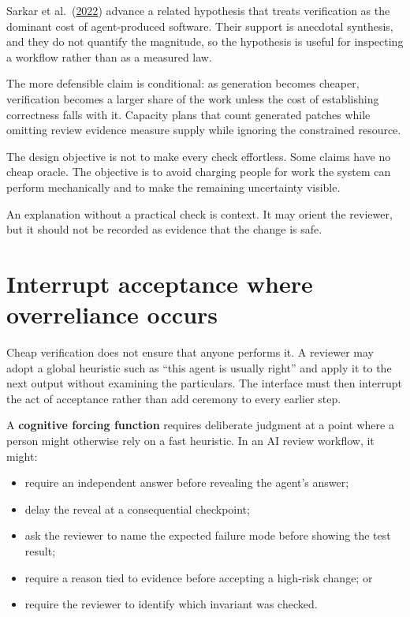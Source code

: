 Sarkar et al.~(\href{https://arxiv.org/abs/2208.06213}{2022}) advance a related hypothesis that treats verification as the dominant cost of agent-produced software. Their support is anecdotal synthesis, and they do not quantify the magnitude, so the hypothesis is useful for inspecting a workflow rather than as a measured law.

The more defensible claim is conditional: as generation becomes cheaper, verification becomes a larger share of the work unless the cost of establishing correctness falls with it. Capacity plans that count generated patches while omitting review evidence measure supply while ignoring the constrained resource.

The design objective is not to make every check effortless. Some claims have no cheap oracle. The objective is to avoid charging people for work the system can perform mechanically and to make the remaining uncertainty visible.

An explanation without a practical check is context. It may orient the reviewer, but it should not be recorded as evidence that the change is safe.

\section{Interrupt acceptance where overreliance occurs}\label{interrupt-acceptance-where-overreliance-occurs}

Cheap verification does not ensure that anyone performs it. A reviewer may adopt a global heuristic such as ``this agent is usually right'' and apply it to the next output without examining the particulars. The interface must then interrupt the act of acceptance rather than add ceremony to every earlier step.

A \textbf{cognitive forcing function} requires deliberate judgment at a point where a person might otherwise rely on a fast heuristic. In an AI review workflow, it might:

\begin{itemize}
\tightlist
\item
  require an independent answer before revealing the agent's answer;
\item
  delay the reveal at a consequential checkpoint;
\item
  ask the reviewer to name the expected failure mode before showing the test result;
\item
  require a reason tied to evidence before accepting a high-risk change; or
\item
  require the reviewer to identify which invariant was checked.
\end{itemize}

